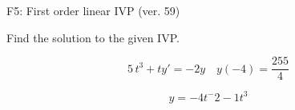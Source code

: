 \begin{exercise}
  \begin{exerciseTitle}F5: First order linear IVP (ver. 59)\end{exerciseTitle}
  \begin{exerciseStatement}
    
Find the solution to the given IVP.

    
\[5 \, t^{3} +ty'= -2 y \hspace{1em} y( -4 ) = \frac{255}{4}\]

  \end{exerciseStatement}
  \begin{exerciseAnswer}
    
\[y= -4 t^ -2 -1 t^{3}\]

  \end{exerciseAnswer}
\end{exercise}